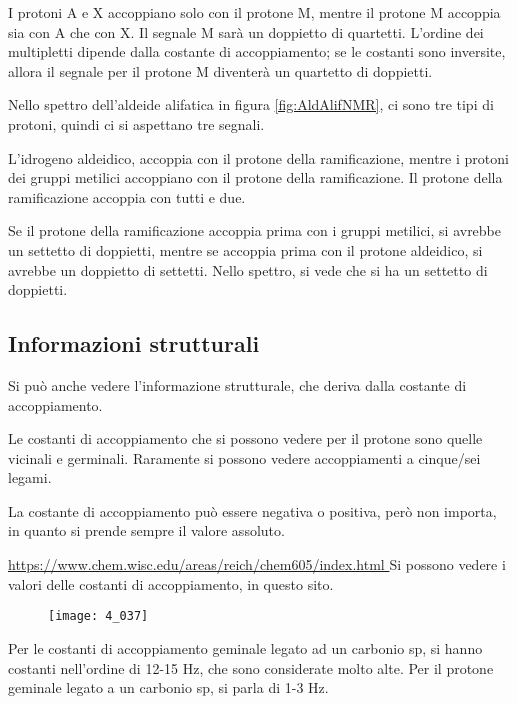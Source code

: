 I protoni A e X accoppiano solo con il protone M, mentre il protone M accoppia sia con A che con X. Il segnale M sarà un doppietto di quartetti. L'ordine dei multipletti dipende dalla costante di accoppiamento; se le costanti sono inversite, allora il segnale per il protone M diventerà un quartetto di doppietti.



Nello spettro dell'aldeide alifatica in figura \ref{fig:AldAlifNMR}, ci sono tre tipi di protoni, quindi ci si aspettano tre segnali.

L'idrogeno aldeidico, accoppia con il protone della ramificazione, mentre i protoni dei gruppi metilici accoppiano con il protone della ramificazione. Il protone della ramificazione accoppia con tutti e due.

Se il protone della ramificazione accoppia prima con i gruppi metilici, si avrebbe un settetto di doppietti, mentre se accoppia prima con il protone aldeidico, si avrebbe un doppietto di settetti. Nello spettro, si vede che si ha un settetto di doppietti.

\subsection{Informazioni strutturali}
Si può anche vedere l'informazione strutturale, che deriva dalla costante di accoppiamento.

Le costanti di accoppiamento che si possono vedere per il protone sono quelle vicinali e germinali. Raramente si possono vedere accoppiamenti a cinque/sei legami.

La costante di accoppiamento può essere negativa o positiva, però non importa, in quanto si prende sempre il valore assoluto.

\url{
  https://www.chem.wisc.edu/areas/reich/chem605/index.html
}
Si possono vedere i valori delle costanti di accoppiamento, in questo sito.

\begin{figure}
  \texttt{[image: 4\_037]}
\end{figure}

Per le costanti di accoppiamento geminale legato ad un carbonio sp, si hanno costanti nell'ordine di 12-15 Hz, che sono considerate molto alte. Per il protone geminale legato a un carbonio sp, si parla di 1-3 Hz.


